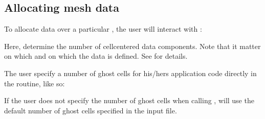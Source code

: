 \documentclass[letterpaper,10pt,english]{sphinxmanual}
\begin{document}
\subsection{Allocating mesh data}
\label{\detokenize{Source/MeshData:allocating-mesh-data}}
To allocate data over a particular , the user will interact with {\hyperref[\detokenize{Source/AmrMesh:chap-amrmesh}]{}}:

\begin{sphinxVerbatim}[commandchars=\\\{\},formatcom=\scriptsize]
   
 
   
\end{sphinxVerbatim}

Here,  determine the number of cell\sphinxhyphen{}centered data components.
Note that it  matter on which  and on which  the data is defined.
See {\hyperref[\detokenize{Source/Realm:chap-realm}]{}} for details.

The user  specify a number of ghost cells for his/hers application code directly in the  routine, like so:

\begin{sphinxVerbatim}[commandchars=\\\{\},formatcom=\scriptsize]
   
 
    
\end{sphinxVerbatim}

If the user does not specify the number of ghost cells when calling ,  will use the default number of ghost cells specified in the input file.
\end{document}
